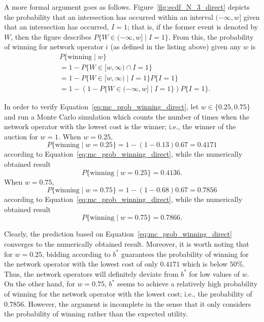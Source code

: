 A more formal argument goes as follows. Figure~\ref{fig:ecdf_N_3_direct} depicts the probability that an intersection has occurred within an interval $(-\infty,w]$ given that an intersection has occurred, $I=1$; that is, if the former event is denoted by $W$, then the figure describes $P\{W\in(-\infty, w] \mid I=1\}$. From this, the probability of winning for network operator $i$ (as defined in the listing above) given any $w$ is
\begin{align}
	&P\{\text{winning} \mid w\} \nonumber\\
	&= 1 - P\{W\in[w,\infty) \cap I=1\} \nonumber\\
	&= 1 - P\{W\in[w,\infty)\mid I=1\}P\{I=1\} \nonumber\\
	&= 1 - \left( 1 - P\{W\in(-\infty, w]\mid I=1\} \right)P\{I=1\}.
	\label{eq:mc_prob_winning_direct}
\end{align}

In order to verify Equation~\eqref{eq:mc_prob_winning_direct}, let $w\in\{0.25,0.75\}$ and run a Monte Carlo simulation which counts the number of times when the network operator with the lowest cost is the winner; i.e., the winner of the auction for $w=1$. When $w=0.25$, 
\begin{equation*}
	P\{\text{winning}\mid w=0.25\} = 1 - (1-0.13)0.67 = 0.4171
\end{equation*}
according to Equation~\eqref{eq:mc_prob_winning_direct}, while the numerically obtained result 
\begin{equation*}
	P\{\text{winning}\mid w=0.25\} = 0.4136.
\end{equation*}
When $w=0.75$,
\begin{equation*}
	P\{\text{winning}\mid w=0.75\} = 1 -(1-0.68)0.67 = 0.7856
\end{equation*}
according to Equation~\eqref{eq:mc_prob_winning_direct}, while the numerically obtained result
\begin{equation*}
	P\{\text{winning}\mid w=0.75\} = 0.7866.
\end{equation*}

Clearly, the prediction based on Equation~\eqref{eq:mc_prob_winning_direct} converges to the numerically obtained result. Moreover, it is worth noting that for $w=0.25$, bidding according to $b^*$ guarantees the probability of winning for the network operator with the lowest cost of only $0.4171$ which is below $50\%$. Thus, the network operators will definitely deviate from $b^*$ for low values of $w$. On the other hand, for $w=0.75$, $b^*$ seems to achieve a relatively high probability of winning for the network operator with the lowest cost; i.e., the probability of $0.7856$. However, the argument is incomplete in the sense that it only considers the probability of winning rather than the expected utility.

